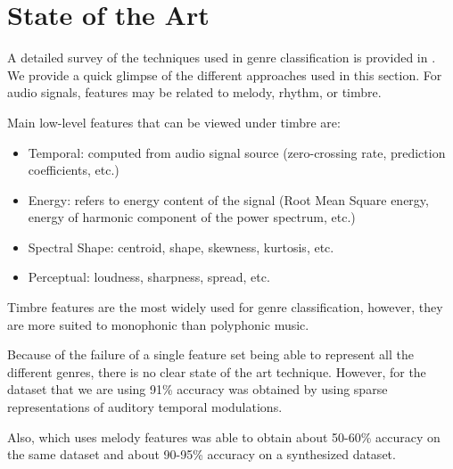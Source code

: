 \documentclass[12pt,journal,compsoc]{IEEEtran}
\begin{document}
%

\section{State of the Art}
A detailed survey of the techniques used in genre classification is provided in \cite{scaringella}. We provide a quick glimpse of the different approaches used in this section. For audio signals, features may be related to melody, rhythm, or timbre.

Main low-level features that can be viewed under timbre \cite{peeters} are:
\begin{itemize}
\item Temporal: computed from audio signal source (zero-crossing rate, prediction coefficients, etc.)
\item Energy: refers to energy content of the signal (Root Mean Square energy, energy of harmonic component of the power spectrum, etc.)
\item Spectral Shape: centroid, shape, skewness, kurtosis, etc.
\item Perceptual: loudness, sharpness, spread, etc.
\end{itemize}
Timbre features are the most widely used for genre classification, however, they are more suited to monophonic than polyphonic music.

Because of the failure of a single feature set being able to represent all the different genres, there is no clear state of the art technique. However, for the dataset that we are using 91\% accuracy was obtained by \cite{panagakis} using sparse representations of auditory temporal modulations.

Also, \cite{salamon01} which uses melody features was able to obtain about 50-60\% accuracy on the same dataset and about 90-95\% accuracy on a synthesized dataset.
\end{document}
